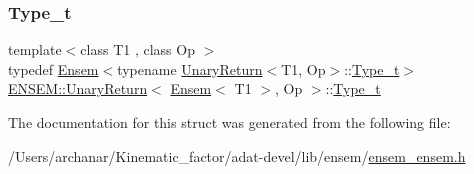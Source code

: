 \subsubsection{\texorpdfstring{Type\_t}{Type\_t}\hspace{0.1cm}{\footnotesize\ttfamily [3/3]}}
{\footnotesize\ttfamily template$<$class T1 , class Op $>$ \\
typedef \mbox{\hyperlink{classENSEM_1_1Ensem}{Ensem}}$<$typename \mbox{\hyperlink{structENSEM_1_1UnaryReturn}{Unary\+Return}}$<$T1, Op$>$\+::\mbox{\hyperlink{structENSEM_1_1UnaryReturn_3_01Ensem_3_01T1_01_4_00_01Op_01_4_a224980bb4b2ff570eb5fcf4036421962}{Type\+\_\+t}}$>$ \mbox{\hyperlink{structENSEM_1_1UnaryReturn}{E\+N\+S\+E\+M\+::\+Unary\+Return}}$<$ \mbox{\hyperlink{classENSEM_1_1Ensem}{Ensem}}$<$ T1 $>$, Op $>$\+::\mbox{\hyperlink{structENSEM_1_1UnaryReturn_3_01Ensem_3_01T1_01_4_00_01Op_01_4_a224980bb4b2ff570eb5fcf4036421962}{Type\+\_\+t}}}



The documentation for this struct was generated from the following file\+:\begin{DoxyCompactItemize}
\item 
/\+Users/archanar/\+Kinematic\+\_\+factor/adat-\/devel/lib/ensem/\mbox{\hyperlink{adat-devel_2lib_2ensem_2ensem__ensem_8h}{ensem\+\_\+ensem.\+h}}\end{DoxyCompactItemize}
